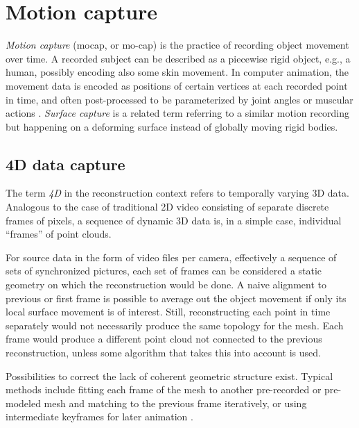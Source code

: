 \clearpage
\section{Motion capture} \label{sec:motioncapture} %

\emph{Motion capture} (mocap, or mo-cap) is the practice of recording object movement over time.
A recorded subject can be described as a piecewise rigid object, e.g., a human, possibly encoding also some skin movement.
In computer animation, the movement data is encoded as positions of certain vertices at each recorded point in time, and often post-processed to be parameterized by joint angles or muscular actions \cite{deng2007computer,waters1987muscle}.
\emph{Surface capture} is a related term referring to a similar motion recording but happening on a deforming surface instead of globally moving rigid bodies.


\subsection{4D data capture} %

The term \emph{4D} in the reconstruction context refers to temporally varying 3D data.
Analogous to the case of traditional 2D video consisting of separate discrete frames of pixels, a sequence of dynamic 3D data is, in a simple case, individual ``frames'' of point clouds.

For source data in the form of video files per camera, effectively a sequence of sets of synchronized pictures, each set of frames can be considered a static geometry on which the reconstruction would be done.
A naive alignment to previous or first frame is possible to average out the object movement if only its local surface movement is of interest.
Still, reconstructing each point in time separately would not necessarily produce the same topology for the mesh.
Each frame would produce a different point cloud not connected to the previous reconstruction, unless some algorithm that takes this into account is used.

Possibilities to correct the lack of coherent geometric structure exist.
Typical methods include fitting each frame of the mesh to another pre-recorded or pre-modeled mesh \cite{bickel2007multi,bradley2010high,li2009robust,zhang2007spacetime} and matching to the previous frame iteratively, or using intermediate keyframes for later animation \cite{beeler2011high}.

